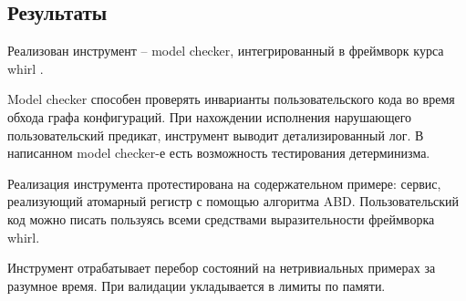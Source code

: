 \subsection{Результаты}

Реализован инструмент – model checker, интегрированный в фреймворк курса whirl \cite{checkers}.

Model checker способен проверять инварианты пользовательского кода во время обхода графа конфигураций. При нахождении исполнения нарушающего пользовательский предикат, инструмент выводит детализированный лог.  В написанном model checker-е есть возможность тестирования детерминизма.

Реализация инструмента протестирована на содержательном примере: сервис, реализующий атомарный регистр с помощью алгоритма ABD. Пользовательский код можно писать пользуясь всеми средствами выразительности фреймворка whirl.

Инструмент отрабатывает перебор состояний на нетривиальных примерах за разумное время. При валидации укладывается в лимиты по памяти.
